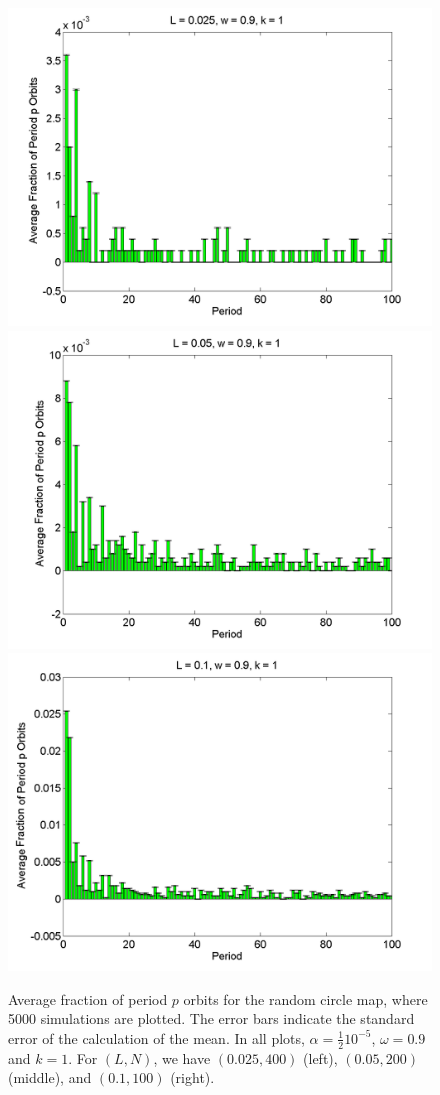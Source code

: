\begin{figure}[H]\linespread{1}
\caption[Average fraction of period $p$ orbits for the random circle
map (normal distribution), for $\alpha = \frac{1}{2}10^{-5}$, $\omega=0.9$ and $k=1$]{Average fraction of period $p$ orbits for the random circle
map, where 5000 simulations are plotted. The error bars indicate
the standard error of the calculation of the mean. In all plots,
$\alpha = \frac{1}{2}10^{-5}$, $\omega=0.9$ and $k=1$. For $(L,N)$,
we have $(0.025, 400)$ (left), $(0.05, 200)$
(middle), and $(0.1, 100)$ (right).}\label{fig:rcirchist_n1_ha}
	\begin{center}
\includegraphics[width=.33\textwidth]{figs/rcirc_hist_n_halfa_L_0025_w_09_k_1_sims_5000.png}\hfill
\includegraphics[width=.33\textwidth]{figs/rcirc_hist_n_halfa_L_005_w_09_k_1_sims_5000.png}\hfill
\includegraphics[width=.33\textwidth]{figs/rcirc_hist_n_halfa_L_01_w_09_k_1_sims_5000.png}
	\end{center}
\end{figure}

